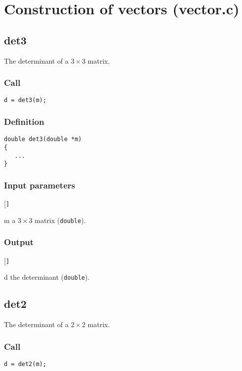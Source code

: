 \section{Construction of vectors (vector.c)}\label{sec:vector.c}




\subsection{{det3}}
The determinant of a $3\times 3$ matrix.

\subsubsection*{Call}
\begin{verbatim}d = det3(m);\end{verbatim}

\subsubsection*{Definition}
\begin{verbatim}
double det3(double *m)
{
   ...
}
\end{verbatim}

\subsubsection*{Input parameters}
\begin{desclist}{\tt }{\quad}[\tt ]
   \setlength\itemsep{0pt}
   \item[m] a $3\times3$ matrix (\texttt{double}).  
\end{desclist}

\subsubsection*{Output}
\begin{desclist}{\tt }{\quad}[\tt ]
   \setlength\itemsep{0pt}
   \item[d] the determinant (\texttt{double}).
\end{desclist}



\subsection{{det2}}
The determinant of a $2\times2$ matrix.

\subsubsection*{Call}
\begin{verbatim}d = det2(m);\end{verbatim}


